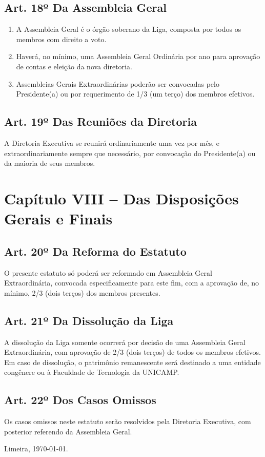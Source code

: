 \documentclass[12pt, a4paper]{article}
\begin{document}
\subsection{Art. 18º Da Assembleia Geral}
\begin{enumerate}[label=\S \arabic*.]
    \item A Assembleia Geral é o órgão soberano da Liga, composta por todos os membros com direito a voto.
    \item Haverá, no mínimo, uma Assembleia Geral Ordinária por ano para aprovação de contas e eleição da nova diretoria.
    \item Assembleias Gerais Extraordinárias poderão ser convocadas pelo Presidente(a) ou por requerimento de 1/3 (um terço) dos membros efetivos.
\end{enumerate}

\subsection{Art. 19º Das Reuniões da Diretoria}
A Diretoria Executiva se reunirá ordinariamente uma vez por mês, e extraordinariamente sempre que necessário, por convocação do Presidente(a) ou da maioria de seus membros.


\section{Capítulo VIII – Das Disposições Gerais e Finais}


\subsection{Art. 20º Da Reforma do Estatuto}
O presente estatuto só poderá ser reformado em Assembleia Geral Extraordinária, convocada especificamente para este fim, com a aprovação de, no mínimo, 2/3 (dois terços) dos membros presentes.

\subsection{Art. 21º Da Dissolução da Liga}
A dissolução da Liga somente ocorrerá por decisão de uma Assembleia Geral Extraordinária, com aprovação de 2/3 (dois terços) de todos os membros efetivos. Em caso de dissolução, o patrimônio remanescente será destinado a uma entidade congênere ou à Faculdade de Tecnologia da UNICAMP.

\subsection{Art. 22º Dos Casos Omissos}
Os casos omissos neste estatuto serão resolvidos pela Diretoria Executiva, com posterior referendo da Assembleia Geral.

\bigskip
\bigskip
\begin{center}
    Limeira, \today.
\end{center}
\end{document}
